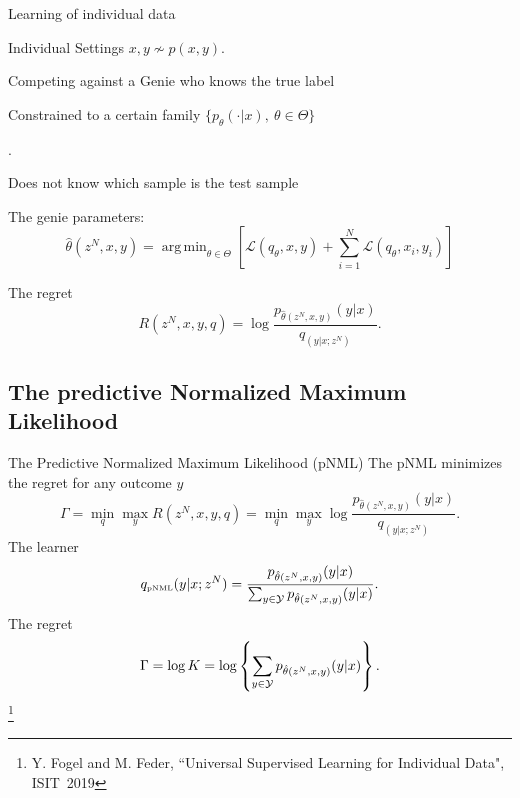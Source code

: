 \documentclass[aspectratio=169]{beamer}
\newcommand\blfootnote[1]{%
  \begingroup
  \renewcommand\thefootnote{}\footnote{#1}%
  \addtocounter{footnote}{-1}%
  \endgroup
}
\def\pNMLSingle{p_{\hat{\theta}(z^N,x,y)} (y|x)}
\newcommand{\SubItem}[1]{
    {\setlength\itemindent{15pt} \item[-] #1}
}
\DeclareMathOperator*{\argmin}{arg\,min}
\begin{document}
\begin{frame}{Learning of individual data}
\begin{itemize}
\setlength\itemsep{0.5em}
\item Individual Settings $x,y \not\sim p(x,y)$.  
\item Competing against a Genie who knows the true label
\SubItem {Constrained to a certain family $\{p_{\theta}(\cdot|x), \ \theta \in \Theta\}$}.
\SubItem {Does not know which sample is the test sample}
\item The genie parameters:
    \begin{equation}
        \hat{\theta}(z^N,x,y) = \argmin_{\theta \in \Theta}\left[\mathcal{L}(q_\theta, x, y) +  \sum_{i=1}^N \mathcal{L}(q_\theta, x_i, y_i) \right]
    \end{equation}
\item The regret
    \begin{equation}
        R(z^N,x,y,q) = \log \frac{p_{\hat{\theta}(z^N,x,y)}(y|x)}{q_(y|x;z^N)}.
    \end{equation}
\end{itemize}
\end{frame}



\subsection{The predictive Normalized Maximum Likelihood}
\begin{frame}{The Predictive Normalized Maximum Likelihood (pNML)}
The pNML minimizes the regret for any outcome $y$ 
\begin{equation} 
    \Gamma = \min_q \max_y R(z^N,x,y,q) = \min_q \max_y \log \frac{p_{\hat{\theta}(z^N,x,y)}(y|x)}{q_(y|x;z^N)}.
\end{equation}
The learner
\begin{equation}
    q_{\mbox{\tiny{pNML}}}(y|x;z^N)=\frac{\pNMLSingle}{\sum_{y\in {\cal Y}} \pNMLSingle}.
\end{equation}
The regret
\begin{equation}
    \Gamma = \log K = \log \left\{ \sum_{y\in {\cal Y}} \pNMLSingle \right\}.
\end{equation}
\blfootnote{Y.  Fogel  and  M.  Feder, ``Universal Supervised Learning for Individual Data", ISIT~2019}
\end{frame}
\end{document}
